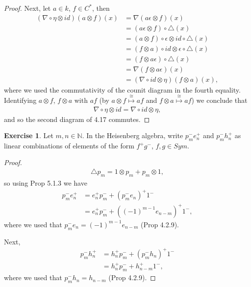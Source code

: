 \documentclass[8pt]{extarticle}
\newcommand{\N}{\mathbb{N}}
\newcommand{\<}{\langle}
\renewcommand{\>}{\rangle}
\theoremstyle{definition}
\newtheorem{exercise}{Exercise}
\begin{document}
\begin{proof}
  Next, let $a \in k$, $f \in C^*$, then
  \begin{align*}
    (\nabla \circ \eta \otimes id)(a \otimes f)(x)
    &=
    \nabla(a \epsilon \otimes f)(x) \\
    &=
    (a \epsilon \otimes f) \circ \triangle (x) \\
    &=
    (a \otimes f)\circ \epsilon \otimes id \circ \triangle (x) \\
    &=
    (f \otimes a) \circ id \otimes \epsilon \circ \triangle (x) \\
    &=
    (f \otimes a \epsilon)  \circ \triangle (x) \\
    &=
    \nabla(f \otimes a \epsilon) (x) \\
    &= (\nabla \circ id \otimes \eta)(f \otimes a) (x),
  \end{align*}
  where we used the commutativity of the counit diagram in the fourth equality. Identifying $a \otimes f$, $f \otimes a$  with $af$ (by $a \otimes f \overset{\cong}{\mapsto} af$ and $f \otimes a \overset{\cong}{\mapsto} af$) we conclude that
  \begin{align*}
    \nabla \circ \eta \otimes id = \nabla \circ id \otimes \eta,
  \end{align*}
  and so the second diagram of 4.17 commutes.
\end{proof}
\newpage
\begin{exercise}
  Let $m,n \in \N$. In the Heisenberg algebra, write $p_m^-e_n^+$ and $p_m^-h_n^+$ as linear combinations of elements of the form $f^+g^-$, $f,g \in Sym$.
\end{exercise}
\begin{proof}
  \begin{align*}
    \triangle p_m = 1 \otimes p_m + p_m \otimes 1,
  \end{align*}
  so using Prop 5.1.3 we have 
  \begin{align*}
    p_m^- e_n^+
    &=
    e_n^+p_m^- + (p_m^-e_n)^+1^- \\
    &=
    e_n^+p_m^- + ((-1)^{m-1}e_{n-m})^+1^-,
  \end{align*}
  where we used that $p_m^- e_n = (-1)^{m-1}e_{n-m}$ (Prop 4.2.9).

  Next,
  \begin{align*}
    p_m^-h_n^+
    &=
    h_n^+p_m^- + (p_m^-h_n)^+1^- \\
    &= h_n^+p_m^- + h_{n-m}^+1^-,
  \end{align*}
  where we used that $p_m^-h_n = h_{n-m}$ (Prop 4.2.9).
\end{proof}
\end{document}
